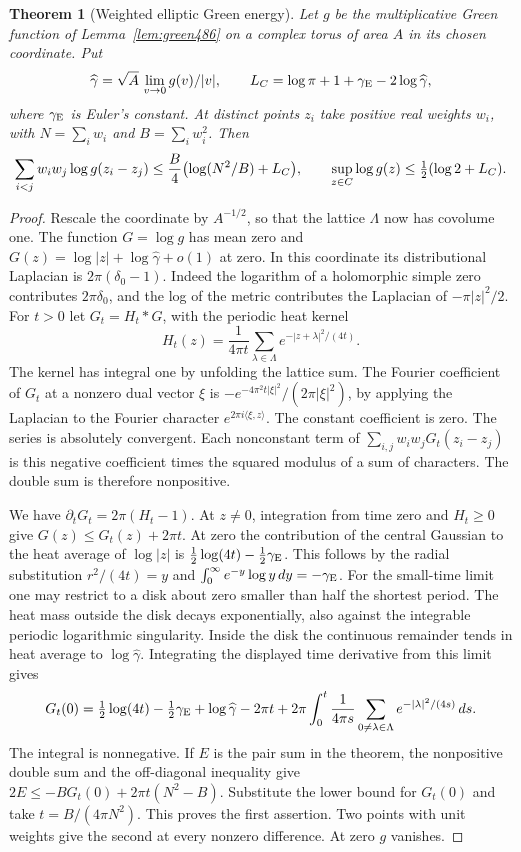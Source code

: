 \documentclass[a4paper,11pt]{article}
\newtheorem{theorem}[proposition]{Theorem}
\theoremstyle{definition}
\theoremstyle{remark}
\numberwithin{equation}{section}
\begin{document}
\begin{theorem}[Weighted elliptic Green energy]\leavevmode
\label{thm:greenenergy488}
Let \(g\) be the multiplicative Green function of
Lemma~\ref{lem:green486} on a complex torus of area \(A\) in its
chosen coordinate. Put
\[
 \widehat\gamma=\sqrt A\,\lim_{v\to0}g(v)/|v|,\qquad
 L_C=\log\pi+1+\gamma_{\rm E}-2\log\widehat\gamma ,
\]
where \(\gamma_{\rm E}\) is Euler's constant. At distinct points
\(z_i\) take positive real weights \(w_i\), with
\(N=\sum_iw_i\) and \(B=\sum_iw_i^2\). Then
\[
 \sum_{i<j} w_iw_j\log g(z_i-z_j)
       \le {B\over4}\bigl(\log(N^2/B)+L_C\bigr),
 \qquad
 \sup_{z\in C}\log g(z)\le\tfrac12(\log 2+L_C).
\]
\end{theorem}
\begin{proof}
Rescale the coordinate by \(A^{-1/2}\), so that the lattice
\(\Lambda\) now has covolume one. The function \(G=\log g\) has
mean zero and \(G(z)=\log|z|+\log\widehat\gamma+o(1)\) at zero.
In this coordinate its distributional Laplacian is
\(2\pi(\delta_0-1)\). Indeed the logarithm of a holomorphic
simple zero contributes \(2\pi\delta_0\), and the log of the metric
contributes the Laplacian of \(-\pi|z|^2/2\).
For \(t>0\) let \(G_t=H_t*G\), with the periodic heat kernel
\[
 H_t(z)=\frac{1}{4\pi t}\sum_{\lambda\in\Lambda}
                              e^{-|z+\lambda|^2/(4t)}.
\]
The kernel has integral one by unfolding the lattice sum.
The Fourier coefficient of \(G_t\) at a nonzero dual vector
\(\xi\) is \(-e^{-4\pi^2t|\xi|^2}/(2\pi|\xi|^2)\), by applying
the Laplacian to the Fourier character
\(e^{2\pi i\langle \xi,z\rangle}\). The constant coefficient is
zero. The series is absolutely convergent. Each nonconstant
term of \(\sum_{i,j}w_i w_j G_t(z_i-z_j)\) is this negative
coefficient times the squared modulus of a sum of characters.
The double sum is therefore nonpositive.

We have \(\partial_tG_t=2\pi(H_t-1)\). At \(z\ne0\), integration
from time zero and \(H_t\ge0\) give \(G(z)\le G_t(z)+2\pi t\).
At zero the contribution of the central Gaussian to the heat
average of \(\log|z|\) is
\(\tfrac12\log(4t)-\tfrac12\gamma_{\rm E}\). This follows by
the radial substitution \(r^2/(4t)=y\) and
\(\int_0^\infty e^{-y}\log y\,dy=-\gamma_{\rm E}\).
For the small-time limit one may restrict to a disk about zero
smaller than half the shortest period. The heat mass outside
the disk decays exponentially, also against the integrable
periodic logarithmic singularity. Inside the disk the continuous
remainder tends in heat average to \(\log\widehat\gamma\).
Integrating the displayed time derivative from this limit gives
\[
 G_t(0)=\tfrac12\log(4t)-\tfrac12\gamma_{\rm E}
       +\log\widehat\gamma-2\pi t
       +2\pi\int_0^t {1\over4\pi s}
                         \sum_{0\ne\lambda\in\Lambda}
                          e^{-|\lambda|^2/(4s)}\,ds .
\]
The integral is nonnegative. If \(E\) is the pair sum in
the theorem, the nonpositive double sum and the off-diagonal
inequality give \(2E\le-BG_t(0)+2\pi t(N^2-B)\).
Substitute the lower bound for \(G_t(0)\) and take
\(t=B/(4\pi N^2)\). This proves the first assertion. Two points
with unit weights give the second at every nonzero difference.
At zero \(g\) vanishes.
\end{proof}
\end{document}
